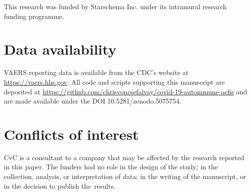 \documentclass{article}
\begin{document}
This research was funded by Starschema Inc. under its intramural research funding programme.

\section*{Data availability}

VAERS reporting data is available from the CDC's website at \url{https://vaers.hhs.gov}.
All code and scripts supporting this manuscript are deposited at
\url{https://github.com/chrisvoncsefalvay/covid-19-autommune-aefis} and are made available under the DOI 10.5281/zenodo.5075754.

\section*{Conflicts of interest}

CvC is a consultant to a company that may be affected by the research reported in this paper.
The funders had no role in the design of the study;
in the collection, analysis, or interpretation of data;
in the writing of the manuscript, or in the decision to publish the~results.


\end{document}
